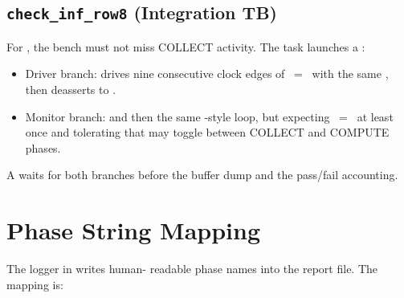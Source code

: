 \subsection{\texttt{check\_inf\_row8} (Integration TB)}
\label{app:tb-checkinf}

For , the bench must not miss COLLECT activity. The task
launches a :

\begin{itemize}
    \item Driver branch: drives nine consecutive clock edges of
          ~=~ with the same
          , then deasserts to .
    \item Monitor branch:  and then the same
          -style loop, but expecting
          ~=~ at least once and
          tolerating that  may toggle between
          COLLECT and COMPUTE phases.
\end{itemize}

A  waits for both branches before the buffer dump and the
pass/fail accounting.

\section{Phase String Mapping}
\label{app:tb-phases}

The logger in  writes human-
readable phase names into the report file. The mapping is:

